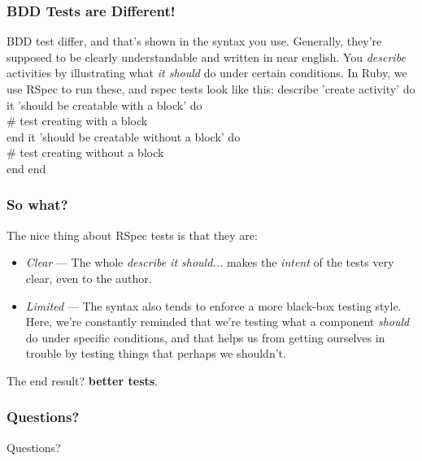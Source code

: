 \documentclass[t, 10pt]{beamer}
\begin{document}
\begin{frame}
\frametitle{BDD Tests are Different!}
BDD test differ, and that's shown in the syntax you use.  Generally, they're supposed to be clearly understandable and written in near english.  You \textit{describe} activities by illustrating what \textit{it should} do under certain conditions.
\newline
\newline
In Ruby, we use RSpec to run these, and rspec tests look like this:
\newline
\newline
describe 'create activity' do
\newline
\newline
  it 'should be creatable with a block' do \\
    \# test creating with a block \\
  end
\newline
\newline
  it 'should be creatable without a block' do \\
    \# test creating without a block \\
  end
\newline
\newline
end
\end{frame}

\begin{frame}
\frametitle{So what?}
The nice thing about RSpec tests is that they are:
\begin{itemize}
\item \textit{Clear} --- The whole \textit{describe it should...} makes the \textit{intent} of the tests very clear, even to the author.
\item \textit{Limited} --- The syntax also tends to enforce a more black-box testing style.  Here, we're constantly reminded that we're testing what a component \textit{should} do under specific conditions, and that helps us from getting ourselves in trouble by testing things that perhaps we shouldn't.
\end{itemize}
The end result? \textbf{better tests}.
\end{frame}

\begin{frame}
\frametitle{Questions?}
\begin{center}
Questions?
\end{center}
\end{frame}
\end{document}

